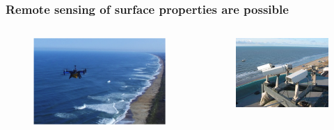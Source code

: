 \documentclass[7pt]{beamer}
\begin{document}
    \begin{frame}
      \frametitle{Remote sensing of surface properties are possible}
      \begin{columns}
        \begin{figure}[H]
          \centering
          \includegraphics[width=1\linewidth]{img/remoteSensingUAV.png}
        \end{figure}
        \begin{figure}[H]
          \centering
          \includegraphics[width=0.9\linewidth]{img/argus_camera.JPG}
        \end{figure}
      \end{columns}
    \end{frame}
\end{document}
